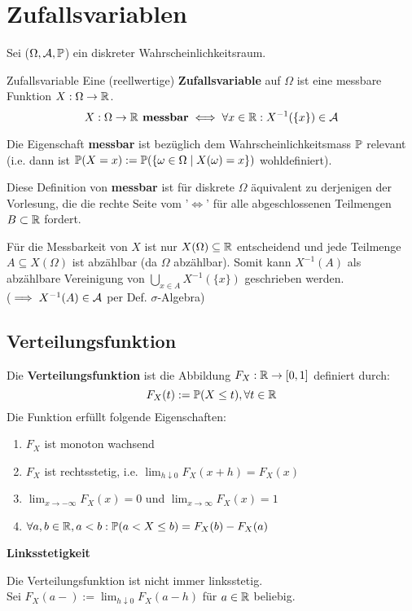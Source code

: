 \section{Zufallsvariablen}
Sei ($\Omega, \A, \P$) ein diskreter Wahrscheinlichkeitsraum.
\begin{mainbox}{Zufallsvariable}
    Eine (reellwertige) \textbf{Zufallsvariable} auf $\Omega$ ist eine messbare Funktion $X: \Omega \to \R$.
    $$X: \Omega \to \R \textbf{ messbar} \iff \forall x \in \R: X^{-1}(\{x\}) \in \A$$
 
    Die Eigenschaft \textbf{messbar} ist bezüglich dem Wahrscheinlichkeitsmass $\P$ relevant (i.e. dann ist $\P(X = x) := \P(\{\omega \in \Omega \mid X(\omega) = x\})$ wohldefiniert).
\end{mainbox}
Diese Definition von \textbf{messbar} ist für diskrete $\Omega$ äquivalent zu derjenigen der Vorlesung, die die rechte Seite vom '$\iff$' für alle abgeschlossenen Teilmengen $B \subset \R$ fordert. 

Für die Messbarkeit von $X$ ist nur $X(\Omega) \subseteq \R$ entscheidend und jede Teilmenge $A \subseteq X(\Omega)$ ist abzählbar (da $\Omega$ abzählbar). Somit kann $X^{-1}(A)$ als abzählbare Vereinigung von $\bigcup_{x \in A} X^{-1}(\{x\})$ geschrieben werden. 
\\($\implies X^{-1}(A) \in \A$ per Def. $\sigma$-Algebra)
\subsection{Verteilungsfunktion}
Die \textbf{Verteilungsfunktion} ist die Abbildung $F_X : \R \to [0,1]$ definiert durch:
$$F_X(t) := \P(X \leq t), \forall t \in \R$$
\vfill\break
Die Funktion erfüllt folgende Eigenschaften:
\begin{enumerate}
    \item $F_X$ ist monoton wachsend 
    \item $F_X$ ist rechtsstetig, i.e. $\lim_{h \downarrow 0}F_X(x+h) = F_X(x)$
    \item $\lim_{x \to -\infty}F_X(x) = 0$ und $\lim_{x \to \infty}F_X(x) = 1$
    \item $\forall a,b \in \R, a < b: \P(a < X \leq b) = F_X(b) -F_X(a)$ 
\end{enumerate}

\textbf{Linksstetigkeit}

Die Verteilungsfunktion ist nicht immer linksstetig.
\\Sei $F_X(a-) := \lim_{h \downarrow 0}F_X(a-h)$ für $a \in \R$ beliebig.

